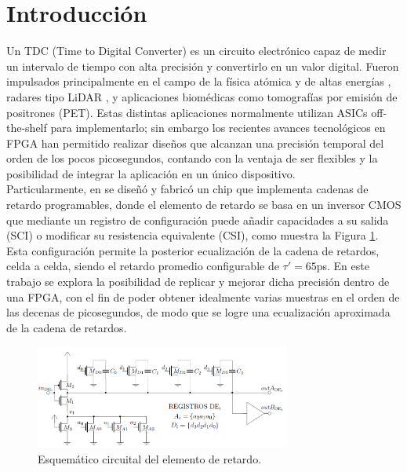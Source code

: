 \clearpage

\section{Introducción}
Un TDC (Time to Digital Converter) es un circuito electrónico capaz de medir un intervalo de tiempo con alta precisión y convertirlo en un valor digital. 
Fueron impulsados principalmente en el campo de la física atómica y de altas energías \cite{Altruda2023}, radares tipo LiDAR \cite{Maatta1998}, 
y aplicaciones biomédicas como tomografías por emisión de positrones (PET). Estas distintas aplicaciones normalmente utilizan  ASICs off-the-shelf para
implementarlo; sin embargo los recientes avances tecnológicos en FPGA han permitido realizar diseños
que alcanzan una precisión temporal del orden de los pocos picosegundos, contando con la ventaja de ser flexibles y la posibilidad de integrar la aplicación
en un único dispositivo. \\

Particularmente, en \cite{Nacho} se diseñó y fabricó 
un chip que implementa cadenas de retardo programables, donde el elemento de retardo se basa
en un inversor CMOS que mediante un registro de configuración puede añadir capacidades a su 
salida (SCI) o modificar su resistencia equivalente (CSI), como muestra la Figura \ref{fig: nacho_delay}.
Esta configuración permite la posterior ecualización de la cadena de retardos, celda a celda,
siendo el retardo promedio configurable de $\tau ' = 65$ps.
En este trabajo se explora la posibilidad de replicar y mejorar dicha precisión dentro de una FPGA,
con el fin de poder obtener idealmente varias muestras en el orden de las decenas de picosegundos, 
de modo que se logre una ecualización aproximada de la cadena de retardos.

\begin{figure}[H]
      \centering
      \includegraphics[width=0.75\textwidth]{imagenes/nacho_delay.png}
      \caption{Esquemático circuital del elemento de retardo.}
      \label{fig: nacho_delay}
\end{figure}

